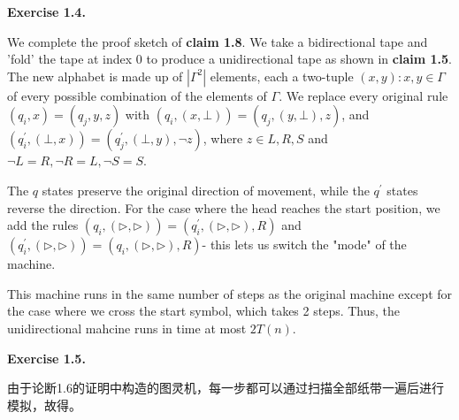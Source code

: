 \documentclass[a4paper]{article}
\newenvironment{exercise}[1]{
	\par
	\noindent\textbf{Exercise #1.}\quad
}{
	\par
	\bigskip
}
\begin{document}
\begin{exercise}{1.4}
    We complete the proof sketch of \textbf{claim 1.8}. We take a bidirectional tape and 'fold' the tape at index 0 to produce a unidirectional tape as shown in \textbf{claim 1.5}. The new alphabet is made up of $|\Gamma^2|$ elements, each a two-tuple $(x,y):x,y \in \Gamma$ of every possible combination of the elements of $\Gamma$. We replace every original  rule $(q_i,x)=(q_j,y,z)$ with $(q_i,(x,\bot))=(q_j,(y,\bot),z)$, and $(q^{\prime}_i,(\bot,x))=(q^{\prime}_j,(\bot,y),\lnot z)$, where $z \in {L,R,S}$ and $\lnot L=R,\lnot R=L, \lnot S=S$.
    
    The $q$ states preserve the original direction of movement, while the $q^{\prime}$ states reverse the direction. For the case where the head  reaches the start position, we add the rules $(q_i,(\rhd,\rhd))=(q^{\prime}_i,(\rhd,\rhd),R)$ and $(q^{\prime}_i,(\rhd,\rhd))=(q_i,(\rhd,\rhd),R)$- this lets us switch the "mode" of the machine.
    
    This machine runs in the same number of steps as the original machine except for the case where we cross the start symbol, which takes 2 steps. Thus, the unidirectional mahcine runs in time at most $2T(n)$.
\end{exercise}

\begin{exercise}{1.5}
    由于论断1.6的证明中构造的图灵机，每一步都可以通过扫描全部纸带一遍后进行模拟，故得。
\end{exercise}
\end{document}
